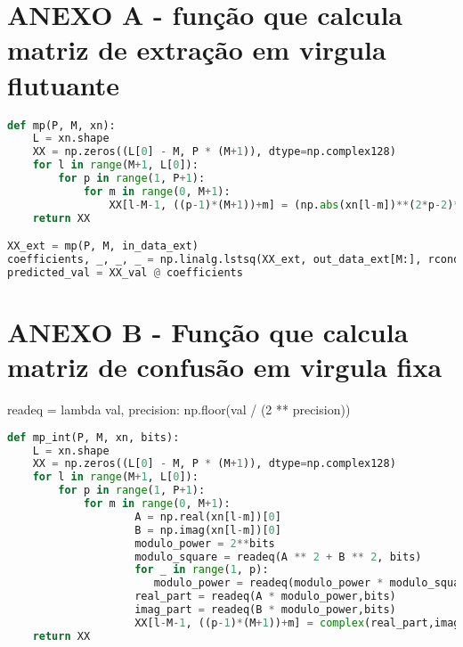 \chapter*{\normalsize ANEXO A - função que calcula matriz de extração em virgula flutuante}
\label{cod:mp}
\small %
\begin{lstlisting}[language = Python, ]
def mp(P, M, xn):
    L = xn.shape
    XX = np.zeros((L[0] - M, P * (M+1)), dtype=np.complex128)
    for l in range(M+1, L[0]):
        for p in range(1, P+1):
            for m in range(0, M+1):
                XX[l-M-1, ((p-1)*(M+1))+m] = (np.abs(xn[l-m])**(2*p-2)*(xn[l-m]))[0]
    return XX

XX_ext = mp(P, M, in_data_ext)
coefficients, _, _, _ = np.linalg.lstsq(XX_ext, out_data_ext[M:], rcond=None)
predicted_val = XX_val @ coefficients

\end{lstlisting}

\chapter*{\normalsize ANEXO B - Função que calcula matriz de confusão em virgula fixa}

readeq = lambda val, precision: np.floor(val / (2 ** precision))

\label{cod:mpint}
\small %
\begin{lstlisting}[language = Python, ]
    def mp_int(P, M, xn, bits):
    L = xn.shape
    XX = np.zeros((L[0] - M, P * (M+1)), dtype=np.complex128)
    for l in range(M+1, L[0]):
        for p in range(1, P+1):
            for m in range(0, M+1):
                    A = np.real(xn[l-m])[0]
                    B = np.imag(xn[l-m])[0]
                    modulo_power = 2**bits 
                    modulo_square = readeq(A ** 2 + B ** 2, bits)
                    for _ in range(1, p):
                       modulo_power = readeq(modulo_power * modulo_square, bits)
                    real_part = readeq(A * modulo_power,bits)
                    imag_part = readeq(B * modulo_power,bits)
                    XX[l-M-1, ((p-1)*(M+1))+m] = complex(real_part,imag_part)        
    return XX

\end{lstlisting}
